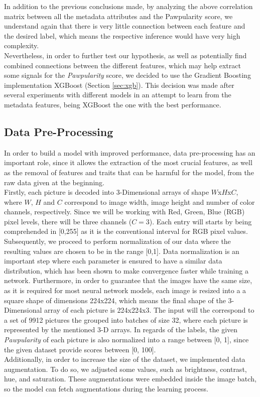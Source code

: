 \documentclass{article}
\begin{document}
In addition to the previous conclusions made, by analyzing the above correlation matrix between all the metadata attributes and the Pawpularity score, we understand again that there is very little connection between each feature and the desired label, which means the respective inference would have very high complexity.\\
Nevertheless, in order to further test our hypothesis, as well as potentially find combined connections between the different features, which may help extract some signals for the \textit{Pawpularity} score, we decided to use the Gradient Boosting implementation XGBoost \cite{xgboost} (Section \ref{sec:xgb}). This decision was made after several experiments with different models in an attempt to learn from the metadata features, being XGBoost the one with the best performance.

\subsection{Data Pre-Processing}
In order to build a model with improved performance, data pre-processing has an important role, since it allows the extraction of the most crucial features, as well as the removal of features and traits that can be harmful for the model, from the raw data given at the beginning.\\
Firstly, each picture is decoded into 3-Dimensional arrays of shape $W$x$H$x$C$, where $W$, $H$ and $C$ correspond to image width, image height and number of color channels, respectively. Since we will be working with Red, Green, Blue (RGB) pixel levels, there will be three channels ($C = 3$). Each entry will starts by being comprehended in [0,255] as it is the conventional interval for RGB pixel values. Subsequently, we proceed to perform normalization of our data where the resulting values are chosen to be in the range [0,1]. Data normalization is an important step where each parameter is ensured to have a similar data distribution, which has been shown to make convergence faster while training a network. Furthermore, in order to guarantee that the images have the same size, as it is required for most neural network models, each image is resized into a a square shape of dimensions 224x224, which means the final shape of the 3-Dimensional array of each picture is 224x224x3. The input will the correspond to a set of 9912 pictures the grouped into batches of size 32, where each picture is represented by the mentioned 3-D arrays. In regards of the labels, the given \textit{Pawpularity} of each picture is also normalized into a range between [0, 1], since the given dataset provide scores between [0, 100].\\
Additionally, in order to increase the size of the dataset, we implemented data augmentation. To do so, we adjusted some values, such as brightness, contrast, hue, and saturation. These augmentations were embedded inside the image batch, so the model can fetch augmentations during the learning process.
\end{document}
